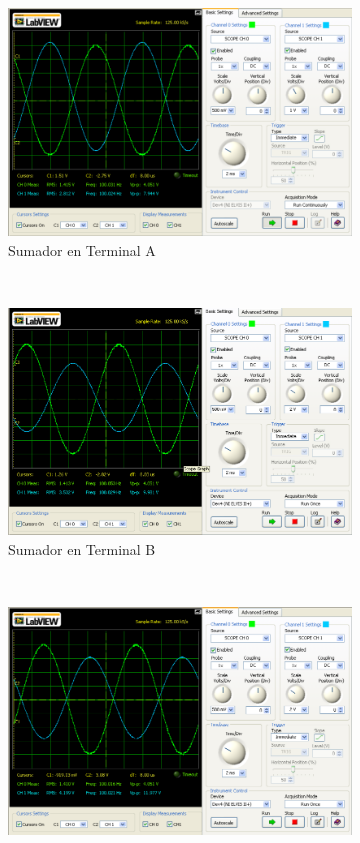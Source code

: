 \documentclass[]{article}
\begin{document}
\begin{figure}[h!]
	
	\centering
	\begin{subfigure}[b]{0.45\textwidth}
		\includegraphics[width=\textwidth]{Imagenes/circuito5sumadorVA.png}
		\caption{Sumador en Terminal A}
		\label{fig:circuito5sumadorVA}
	\end{subfigure}
	~ 
	\begin{subfigure}[b]{0.45\textwidth}
		\includegraphics[width=\textwidth]{Imagenes/circuito5sumadorVB.png}
		\caption{Sumador en Terminal B}
		\label{fig:circuito5sumadorVB}
	\end{subfigure}
	~ 
	\begin{subfigure}[b]{0.45\textwidth}
		\includegraphics[width=\textwidth]{Imagenes/circuito5sumadorVC.png}

\end{subfigure}
\end{figure}
\end{document}
